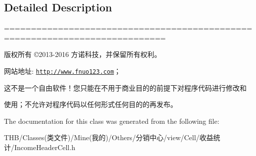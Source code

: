 \subsection{Detailed Description}
============================================================================

版权所有 ©2013-\/2016 方诺科技，并保留所有权利。

网站地址\+: \href{http://www.fnuo123.com}{\tt http\+://www.\+fnuo123.\+com}； 



这不是一个自由软件！您只能在不用于商业目的的前提下对程序代码进行修改和

使用；不允许对程序代码以任何形式任何目的的再发布。 

 

The documentation for this class was generated from the following file\+:\begin{DoxyCompactItemize}
\item 
T\+H\+B/\+Classes(类文件)/\+Mine(我的)/\+Others/分销中心/view/\+Cell/收益统计/Income\+Header\+Cell.\+h\end{DoxyCompactItemize}
